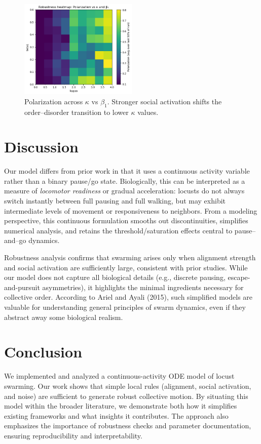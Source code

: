 \documentclass[11pt,a4paper]{article}
\begin{document}
\begin{figure}[H]
    \centering
    \includegraphics[width=0.5\textwidth]{k_vs_b1.png}
    \caption{Polarization across $\kappa$ vs $\beta_1$. Stronger social activation 
    shifts the order–disorder transition to lower $\kappa$ values.}
    \label{fig:scan2}
\end{figure}

\section{Discussion}

Our model differs from prior work in that it uses a continuous activity variable rather than a binary pause/go state. Biologically, this can be interpreted as a measure of \emph{locomotor readiness} or gradual acceleration: locusts do not always switch instantly between full pausing and full walking, but may exhibit intermediate levels of movement or responsiveness to neighbors. From a modeling perspective, this continuous formulation smooths out discontinuities, simplifies numerical analysis, and retains the threshold/saturation effects central to pause–and–go dynamics.  

Robustness analysis confirms that swarming arises only when alignment strength and social activation are sufficiently large, consistent with prior studies. While our model does not capture all biological details (e.g., discrete pausing, escape-and-pursuit asymmetries), it highlights the minimal ingredients necessary for collective order. According to Ariel and Ayali (2015), such simplified models are valuable for understanding general principles of swarm dynamics, even if they abstract away some biological realism.

\section{Conclusion}

We implemented and analyzed a continuous-activity ODE model of locust swarming. Our work shows that simple local rules (alignment, social activation, and noise) are sufficient to generate robust collective motion. By situating this model within the broader literature, we demonstrate both how it simplifies existing frameworks and what insights it contributes. The approach also emphasizes the importance of robustness checks and parameter documentation, ensuring reproducibility and interpretability.
\end{document}
